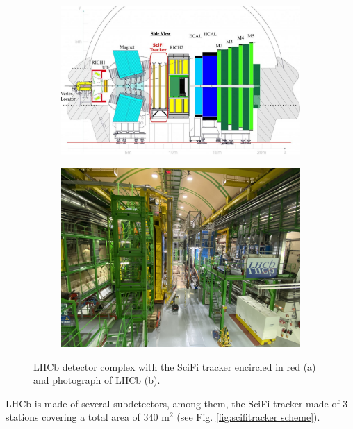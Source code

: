 \begin{figure}[htbp]
    \centering
    \begin{subfigure}{0.48\textwidth}
        \includegraphics[width=\textwidth]{gfx/documentation/LHCb_scifi.jpeg}
        \caption{}
    \end{subfigure}
    \hfill
    \begin{subfigure}{0.48\textwidth}
        \includegraphics[width=\textwidth]{gfx/documentation/IMG_0942.jpeg}
        \caption{}
    \end{subfigure}
    \caption{LHCb detector complex with the SciFi tracker encircled in red \cite{TheEPFL} (a) and photograph of LHCb (b).}
    \label{fig:LHCb detector scheme +scifi}
\end{figure}
LHCb is made of several subdetectors, among them, the SciFi tracker made of 3 stations covering a total area of $340$ m$^2$ (see Fig. \ref{fig:scifitracker scheme}).
